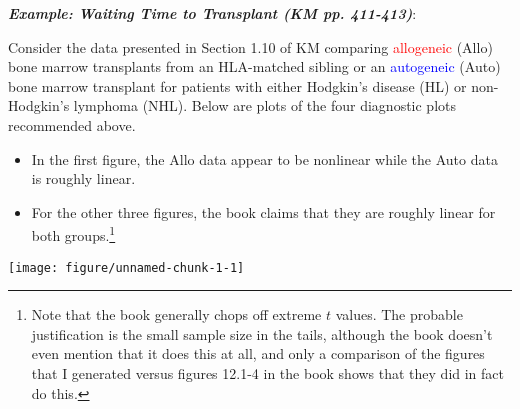 \documentclass[10pt]{article}\usepackage[]{graphicx}\usepackage[]{xcolor}
\makeatletter
\def\maxwidth{ %
  \ifdim\Gin@nat@width>\linewidth
    \linewidth
  \else
    \Gin@nat@width
  \fi
}
\newenvironment{knitrout}{}{} %
\theoremstyle{definition}
\numberwithin{equation}{subsection}
\numberwithin{figure}{section}
\numberwithin{table}{subsection}
\numberwithin{Report}{section}
\numberwithin{Example}{subsection}
\makeatother
\begin{document}
\noindent\textit{\textbf{Example: Waiting Time to Transplant (KM pp. 411-413)}}: 

\noindent Consider the data presented in Section 1.10 of KM comparing \textcolor{red}{allogeneic} (Allo) bone marrow transplants from an HLA-matched sibling or an \textcolor{blue}{autogeneic} (Auto) bone marrow transplant for patients with either Hodgkin’s disease (HL) or non-Hodgkin’s lymphoma (NHL). Below are plots of the four diagnostic plots recommended above.
\begin{itemize}
	\item In the first figure, the Allo data appear to be nonlinear while the Auto data is roughly linear.
	\item For the other three figures, the book claims that they are roughly linear for both groups.\footnote{Note that the book generally chops off extreme $t$ values. The probable justification is the small sample size in the tails, although the book doesn't even mention that it does this at all, and only a comparison of the figures that I generated versus figures 12.1-4 in the book shows that they did in fact do this.}
\end{itemize}

\newpage


\begin{knitrout}
\color{fgcolor}

{\centering \texttt{[image: figure/unnamed-chunk-1-1]} 

}


\end{knitrout}
\end{document}
